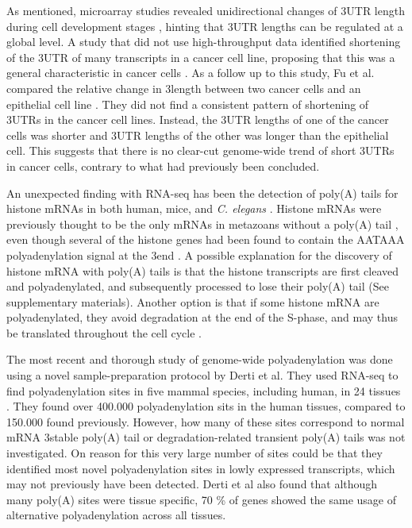 As mentioned, microarray studies revealed unidirectional changes of 3\p UTR
length during cell development stages \cite{sandberg_proliferating_2008,
ji_progressive_2009}, hinting that 3\p UTR lengths can be regulated at a global
level. A study that did not use high-throughput data identified shortening of
the 3\p UTR of many transcripts in a cancer cell line, proposing that this was
a general characteristic in cancer cells \cite{mayr_widespread_2009-2}. As a
follow up to this study, Fu et al. compared the relative change in 3\p length
between two cancer cells and an epithelial cell line
\cite{fu_differential_2011}. They did not find a consistent pattern of
shortening of 3\p UTRs in the cancer cell lines. Instead, the 3\p UTR lengths
of one of the cancer cells was shorter and 3\p UTR lengths of the other was
longer than the epithelial cell. This suggests that there is no clear-cut
genome-wide trend of short 3\p UTRs in cancer cells, contrary to what had
previously been concluded.

An unexpected finding with RNA-seq has been the detection of poly(A) tails for
histone mRNAs in both human, mice, and \textit{C. elegans}
\cite{mangone_landscape_2010-1, shepard_complex_2011}.  Histone mRNAs were
previously thought to be the only mRNAs in metazoans without a poly(A) tail
\cite{marzluff_metabolism_2008}, even though several of the histone genes had
been found to contain the AATAAA polyadenylation signal at the 3\p end
\cite{keall_histone_2007}. A possible explanation for the discovery of histone
mRNA with poly(A) tails is that the histone transcripts are first cleaved and
polyadenylated, and subsequently processed to lose their poly(A) tail
\cite{mangone_landscape_2010-1} (See supplementary materials). Another option
is that if some histone mRNA are polyadenylated, they avoid degradation at the
end of the S-phase, and may thus be translated throughout the cell cycle
\cite{shepard_complex_2011}.

The most recent and thorough study of genome-wide polyadenylation was done
using a novel sample-preparation protocol by Derti et al. They used RNA-seq to
find polyadenylation sites in five mammal species, including human, in 24
tissues \cite{derti_quantitative_2012}. They found over 400.000 polyadenylation
sits in the human tissues, compared to 150.000 found previously. However, how
many of these sites correspond to normal mRNA 3\p stable poly(A) tail or
degradation-related transient poly(A) tails was not investigated. On reason for
this very large number of sites could be that they identified most novel
polyadenylation sites in lowly expressed transcripts, which may not previously
have been detected. Derti et al also found that although many poly(A) sites
were tissue specific, 70 \% of genes showed the same usage of alternative
polyadenylation across all tissues.
